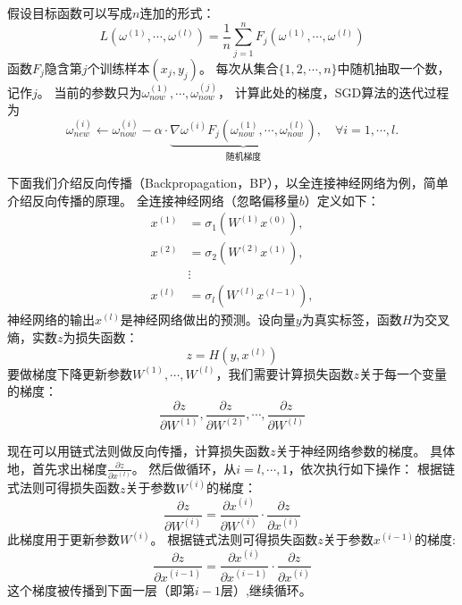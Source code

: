 \documentclass[AutoFakeBold]{LZUThesis}
\begin{document}
假设目标函数可以写成$n$连加的形式：
\begin{equation}
  L(\omega^{(1)}, \cdots, \omega^{(l)}) = \frac1n \sum_{j = 1}^{n}
  F_j (\omega^{(1)}, \cdots, \omega^{(l)})
\end{equation}
函数$F_j$隐含第$j$个训练样本$(x_j, y_j)$。
每次从集合$\{ 1,2,\cdots,n \}$中随机抽取一个数，记作$j$。
当前的参数只为$\omega_{now}^{(1)}, \cdots, \omega_{now}^{(j)}$，
计算此处的梯度，SGD算法的迭代过程为
\begin{equation}
  \omega_{new}^{(i)} \leftarrow \omega_{now}^{(i)} - 
  \alpha \cdot \underbrace{
  \nabla{\omega^{(i)}} F_j \left( \omega_{now}^{(1)}, 
\cdots, \omega_{now}^{(l)} \right)}_\text{随机梯度},
  \quad \forall i = 1, \cdots, l.
\end{equation}

下面我们介绍反向传播（Backpropagation，BP），以全连接神经网络为例，简单介绍反向传播的原理。
全连接神经网络（忽略偏移量$b$）定义如下：
\begin{align*}
  x^{(1)} &= \sigma_1 (W^{(1)} x^{(0)}), \\
  x^{(2)} &= \sigma_2 (W^{(2)} x^{(1)}), \\
  &\vdots                                \\
  x^{(l)} &= \sigma_l (W^{(l)} x^{(l - 1)}),
\end{align*}
神经网络的输出$x^{(l)}$是神经网络做出的预测。设向量$y$为真实标签，函数$H$为交叉熵，实数$z$为损失函数：
\begin{equation}
  z = H(y, x^{(l)})
\end{equation}
要做梯度下降更新参数$W^{(1)}, \cdots, W^{(l)}$，我们需要计算损失函数$z$关于每一个变量的梯度：
\begin{equation}
  \frac{\partial z}{\partial W^{(1)}}, \frac{\partial z}{\partial W^{(2)}}, 
  \cdots, \frac{\partial z}{\partial W^{(l)}}
\end{equation}

现在可以用链式法则做反向传播，计算损失函数$z$关于神经网络参数的梯度。
具体地，首先求出梯度$\frac{\partial z}{\partial x^{(l)}}$。
然后做循环，从$i = l, \cdots, 1$，依次执行如下操作：
根据链式法则可得损失函数$z$关于参数$W^{(i)}$的梯度：
\begin{equation}
  \frac{\partial z}{\partial W^{(i)}} = \frac{\partial x^{(i)}}{\partial W^{(i)}} 
  \cdot \frac{\partial z}{\partial x^{(i)}}
\end{equation}
此梯度用于更新参数$W^{(i)}$。
根据链式法则可得损失函数$z$关于参数$x^{(i - 1)}$的梯度:
\begin{equation}
  \frac{\partial z}{\partial x^{(i - 1)}} = \frac{\partial x^{(i)}}{\partial x^{(i - 1)}} 
  \cdot \frac{\partial z}{\partial x^{(i)}}
\end{equation}
这个梯度被传播到下面一层（即第$i - 1$层）,继续循环。
\end{document}
